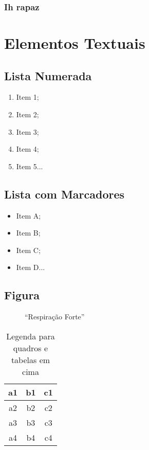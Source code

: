 \documentclass[12pt,openright,oneside,a4paper,english,french,spanish,brazil]{unifil}
\begin{document}
\subsection{Ih rapaz}%




\chapter{Elementos Textuais}

\section{Lista Numerada}

\begin{enumerate}
 \item Item 1;
 \item Item 2;
 \item Item 3;
 \item Item 4;
 \item Item 5...
\end{enumerate}

\section{Lista com Marcadores}

\begin{itemize}
 \item Item A;
 \item Item B;
 \item Item C;
 \item Item D...
\end{itemize}
\cleardoublepage
\section{Figura}

\begin{figure}[htb]
	\centering
	\caption{``Respiração Forte''} 	
\end{figure}

\begin{table}[htb]
\caption{Legenda para quadros e tabelas em cima}
\begin{tabular}{|c|c|c|}
\hline
a1 & b1 & c1 \\ \hline
a2 & b2 & c2 \\ \hline
a3 & b3 & c3 \\ \hline
a4 & b4 & c4 \\ \hline
\end{tabular}
\end{table}
\end{document}
